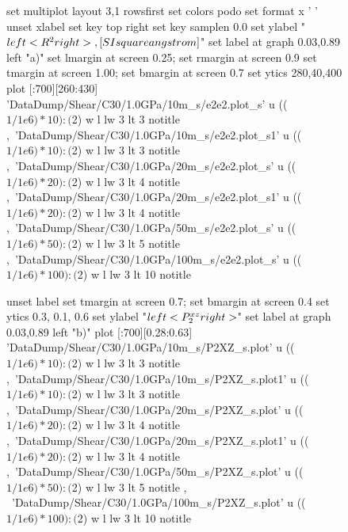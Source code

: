 \documentclass[5p]{elsarticle}
\begin{document}
\begin{figure}[htp]
    	\begin{center}
		\begin{gnuplot}[terminal=epslatex, terminaloptions={size \SERFigwidth cm, \SERFigheight cm color solid}]
			set multiplot layout 3,1 rowsfirst
			set colors podo
			set format x ' '
			unset xlabel
			set key top right
			set key samplen  0.0
			set ylabel "$\\left< R^2\\right>  \\,[\\SI{}{\\square\\angstrom}]$"          
			set label at graph 0.03,0.89 left "a)"
			set lmargin at screen 0.25; set rmargin at screen 0.9
			set tmargin at screen 1.00; set bmargin at screen 0.7
			set ytics 280,40,400 
			plot [:700][260:430] 	'DataDump/Shear/C30/1.0GPa/10m_s/e2e2.plot_s'  u  (($1/1e6)*10):($2) w l  lw 3   lt 3  notitle   ,\
			'DataDump/Shear/C30/1.0GPa/10m_s/e2e2.plot_s1'  u  (($1/1e6)*10):($2) w l  lw 3   lt 3  notitle   ,\
								'DataDump/Shear/C30/1.0GPa/20m_s/e2e2.plot_s'  u  (($1/1e6)*20):($2) w l  lw 3   lt 4  notitle   ,\
								'DataDump/Shear/C30/1.0GPa/20m_s/e2e2.plot_s1'  u  (($1/1e6)*20):($2) w l  lw 3   lt 4  notitle   ,\
								'DataDump/Shear/C30/1.0GPa/50m_s/e2e2.plot_s'   u (($1/1e6)*50):($2) w l  lw 3   lt 5  notitle  ,\
								'DataDump/Shear/C30/1.0GPa/100m_s/e2e2.plot_s' u  (($1/1e6)*100):($2) w l  lw 3   lt 10  notitle  
			
			unset label
			set tmargin at screen 0.7; set bmargin at screen 0.4
			set ytics 0.3, 0.1, 0.6			
			set ylabel "$\\left<P_{2}^{xz}\\right>$"        
			set label at graph 0.03,0.89 left "b)"  
			plot  [:700][0.28:0.63]	'DataDump/Shear/C30/1.0GPa/10m_s/P2XZ_s.plot' u   (($1/1e6)*10):($2) w l lw 3 lt 3  notitle   ,\
			'DataDump/Shear/C30/1.0GPa/10m_s/P2XZ_s.plot1' u   (($1/1e6)*10):($2) w l lw 3 lt 3  notitle   ,\
								'DataDump/Shear/C30/1.0GPa/20m_s/P2XZ_s.plot' u   (($1/1e6)*20):($2) w l  lw 3  lt 4  notitle ,\
								'DataDump/Shear/C30/1.0GPa/20m_s/P2XZ_s.plot1' u   (($1/1e6)*20):($2) w l  lw 3  lt 4  notitle ,\
								'DataDump/Shear/C30/1.0GPa/50m_s/P2XZ_s.plot' u  (($1/1e6)*50):($2) w l  lw 3   lt 5  notitle , \
								'DataDump/Shear/C30/1.0GPa/100m_s/P2XZ_s.plot' u  (($1/1e6)*100):($2) w l  lw 3  lt 10   notitle


\end{gnuplot}
\end{center}
\end{figure}
\end{document}
